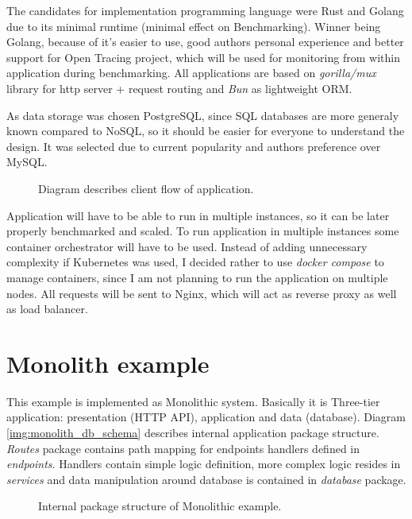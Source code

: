 The candidates for implementation programming language were Rust and Golang due to its minimal runtime (minimal effect on Benchmarking). Winner being Golang, because of it's easier to use, good authors personal experience and better support for Open Tracing project, which will be used for monitoring from within application during benchmarking. All applications are based on \textit{gorilla/mux} \cite{MUX} library for http server + request routing and \textit{Bun} \cite{BUN} as lightweight ORM.

As data storage was chosen PostgreSQL, since SQL databases are more generaly known compared to NoSQL, so it should be easier for everyone to understand the design. It was selected due to current popularity and authors preference over MySQL.
\begin{figure}
    \centering
    
    \caption{Diagram describes client flow of application. \label{img:app_activity_flow}}
\end{figure}

Application will have to be able to run in multiple instances, so it can be later properly benchmarked and scaled. To run application in multiple instances some container orchestrator will have to be used. Instead of adding unnecessary complexity if Kubernetes was used, I decided rather to use \textit{docker compose} to manage containers, since I am not planning to run the application on multiple nodes. All requests will be sent to Nginx, which will act as reverse proxy as well as load balancer.


\section{Monolith example}
This example is implemented as Monolithic system. Basically it is Three-tier application: presentation (HTTP API), application and data (database). Diagram \ref{img:monolith_db_schema} describes internal application package structure. \textit{Routes} package contains path mapping for endpoints handlers defined in \textit{endpoints}. Handlers contain simple logic definition, more complex logic resides in \textit{services} and data manipulation around database is contained in \textit{database} package.

\begin{figure}
    \centering
    
    \caption{Internal package structure of Monolithic example. \label{img:monolith_package}}
\end{figure}



